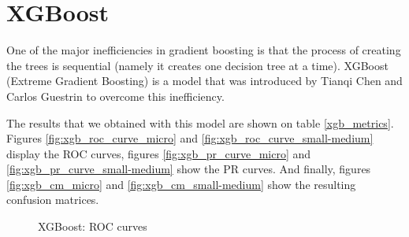 \documentclass[LaM,binding=0.6cm, english]{sapthesis}
\begin{document}
\section{XGBoost}

One of the major inefficiencies in gradient boosting is that the process of creating the trees is sequential (namely it creates one decision tree at a time). XGBoost (Extreme Gradient Boosting) is a model that was introduced by Tianqi Chen and Carlos Guestrin to overcome this inefficiency.\cite{Tianqi2016}

The results that we obtained with this model are shown on table \ref{xgb_metrics}. Figures \ref{fig:xgb_roc_curve_micro} and \ref{fig:xgb_roc_curve_small-medium} display the ROC curves, figures \ref{fig:xgb_pr_curve_micro} and \ref{fig:xgb_pr_curve_small-medium} show the PR curves. And finally, figures \ref{fig:xgb_cm_micro} and \ref{fig:xgb_cm_small-medium} show the resulting confusion matrices.
 
\begin{table}[!ht]
\centering
{}
\vspace{2mm}
\caption{XGBoost metrics}
\label{xgb_metrics}
\end{table}

\begin{figure}[!ht]
  \centering
  \hfill
  \caption{XGBoost: ROC curves}
\end{figure}
\end{document}

